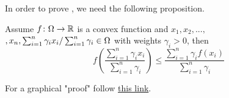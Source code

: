 In order to prove , we need the following proposition.

\begin{proposition}Assume $f\colon\Omega\to\mathbb{R}$ is a convex function and $x_{1}, x_{2}, ...,$\\
$,x_{n},\sum_{i=1}^{n}\gamma_{i}x_{i}/\sum_{i=1}^{n}\gamma_{i}\in\Omega$ with weights $\gamma_{i} > 0$, then
\[
f\left(\frac{\sum_{i=1}^{n}\gamma_{i}x_{i}}{\sum_{i=1}^{n}\gamma_{i}}\right) \leq \frac{\sum_{i=1}^{n}\gamma_{i}f(x_{i})}{\sum_{i=1}^{n}\gamma_{i}}
\]
\end{proposition}

For a graphical "proof" follow
\href{http://mark.reid.name/blog/behold-jensens-inequality.html}{this link}.

